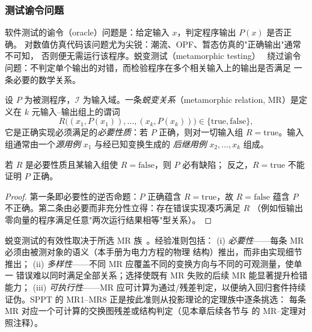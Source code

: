 \subsubsection{测试谕令问题}
软件测试的谕令（oracle）问题是：给定输入 $x$，判定程序输出 $P(x)$ 是否正确。
对数值仿真代码该问题尤为尖锐：潮流、OPF、暂态仿真的"正确输出"通常不可知，
否则便无需运行该程序。蜕变测试（metamorphic testing）~\cite{spth:chen98,spth:segura16}
绕过谕令问题：不判定单个输出的对错，而检验程序在多个相关输入上的输出是否满足
一条必要的数学关系。

\begin{definition}[蜕变关系]\label{def:sp-th-mr}
设 $P$ 为被测程序，$\mathcal I$ 为输入域。一条\emph{蜕变关系}（metamorphic
relation, MR）是定义在 $k$ 元输入--输出组上的谓词
\begin{equation}
R\bigl((x_1,P(x_1)),\dots,(x_k,P(x_k))\bigr)\in\{\mathrm{true},\mathrm{false}\},
\end{equation}
它是正确实现必须满足的\emph{必要性质}：若 $P$ 正确，则对一切输入组
$R=\mathrm{true}$。输入组通常由一个\emph{源用例} $x_1$ 与经已知变换生成的
\emph{后继用例} $x_2,\dots,x_k$ 组成。
\end{definition}

\begin{proposition}[蜕变关系的检错方向]\label{prop:sp-th-mt-direction}
若 $R$ 是必要性质且某输入组使 $R=\mathrm{false}$，则 $P$ 必有缺陷；
反之，$R=\mathrm{true}$ 不能证明 $P$ 正确。
\end{proposition}
\begin{proof}
第一条即必要性的逆否命题：$P$ 正确蕴含 $R=\mathrm{true}$，故 $R=\mathrm{false}$
蕴含 $P$ 不正确。第二条由必要而非充分性立得：存在错误实现凑巧满足 $R$
（例如恒输出零向量的程序满足任意"两次运行结果相等"型关系）。
\end{proof}

\begin{remark}[充分性与多样性准则]\label{rem:sp-th-mr-criteria}
蜕变测试的有效性取决于所选 MR 族~\cite{spth:chen18}。经验准则包括：
(i) \emph{必要性}——每条 MR 必须由被测对象的语义（本手册为电力方程的物理
结构）推出，而非由实现细节推出；
(ii) \emph{多样性}——不同 MR 应覆盖不同的变换方向与不同的可观测量，使单一
错误难以同时满足全部关系；选择使既有 MR 失败的后续 MR 能显著提升检错能力；
(iii) \emph{可执行性}——MR 应可计算为通过/残差判定，以便纳入回归套件持续
证伪。SPPT 的 MR1--MR8 正是按此准则从投影理论的定理族中逐条挑选：
每条 MR 对应一个可计算的交换图残差或结构判定（见本章后续各节与
 的 MR--定理对照注释）。
\end{remark}

